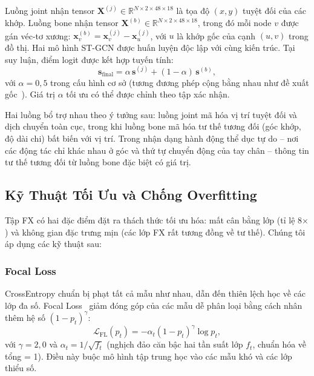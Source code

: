 \documentclass[conference]{IEEEtran}
\begin{document}
Luồng joint nhận tensor $\mathbf{X}^{(j)} \in \mathbb{R}^{N \times 2
\times 48 \times 18}$ là tọa độ $(x,y)$ tuyệt đối của các khớp. Luồng
bone nhận tensor $\mathbf{X}^{(b)} \in \mathbb{R}^{N \times 2 \times 48
\times 18}$, trong đó mỗi node $v$ được gán véc-tơ xương:
$\mathbf{x}^{(b)}_v = \mathbf{x}^{(j)}_v - \mathbf{x}^{(j)}_u$, với
$u$ là khớp gốc của cạnh $(u,v)$ trong đồ thị. Hai mô hình ST-GCN được
huấn luyện độc lập với cùng kiến trúc. Tại suy luận, điểm logit được
kết hợp tuyến tính:
\begin{equation}
  \mathbf{s}_{\text{final}} =
    \alpha\,\mathbf{s}^{(j)} + (1-\alpha)\,\mathbf{s}^{(b)},
\label{eq:fusion}
\end{equation}
với $\alpha = 0{,}5$ trong cấu hình cơ sở (tương đương phép cộng bằng
nhau như đề xuất gốc~\cite{shi2019agcn}). Giá trị $\alpha$ tối ưu có
thể được chỉnh theo tập xác nhận.

Hai luồng bổ trợ nhau theo ý tưởng sau: luồng joint mã hóa vị
trí tuyệt đối và dịch chuyển toàn cục, trong khi luồng bone mã hóa
tư thế tương đối (góc khớp, độ dài chi) bất biến với vị trí. Trong
nhận dạng hành động thể dục tự do -- nơi các động tác chỉ khác nhau
ở góc và thứ tự chuyển động của tay chân -- thông tin tư thế tương đối
từ luồng bone đặc biệt có giá trị.

\subsection{Kỹ Thuật Tối Ưu và Chống Overfitting}
\label{sec:optim}

Tập FX có hai đặc điểm đặt ra thách thức tối ưu hóa: mất cân bằng lớp
(tỉ lệ 8$\times$) và không gian đặc trưng mịn (các lớp FX rất tương
đồng về tư thế). Chúng tôi áp dụng các kỹ thuật sau:

\subsubsection{Focal Loss}
CrossEntropy chuẩn bị phạt tất cả mẫu như nhau, dẫn đến thiên lệch học
về các lớp đa số. Focal Loss~\cite{lin2017focal} giảm đóng góp của các
mẫu dễ phân loại bằng cách nhân thêm hệ số $(1-p_t)^\gamma$:
\begin{equation}
  \mathcal{L}_{\text{FL}}(p_t) = -\alpha_t (1-p_t)^\gamma \log p_t,
\label{eq:focal}
\end{equation}
với $\gamma = 2{,}0$ và $\alpha_t = 1/\sqrt{f_t}$ (nghịch đảo căn bậc
hai tần suất lớp $f_t$, chuẩn hóa về tổng = 1). Điều này buộc mô hình
tập trung học vào các mẫu khó và các lớp thiểu số.
\end{document}
